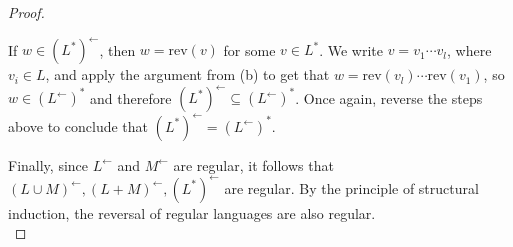 \documentclass[11pt]{article}
\begin{document}
\begin{proof}
\begin{enumerate}[label=(\alph*)]
            If \(w \in (L^*)^\leftarrow\), then \(w = \mathrm{rev} (v)\) for some \(v \in L^*\). We write \(v = v_1 \cdots v_l\), where \(v_i \in L\), and apply the argument from (b) to get that \(w = \mathrm{rev} (v_l) \cdots \mathrm{rev} (v_1)\), so \(w \in (L^\leftarrow)^*\) and therefore \((L^*)^\leftarrow \subseteq (L^\leftarrow)^*\). Once again, reverse the steps above to conclude that \((L^*)^\leftarrow = (L^\leftarrow)^*\).
        \end{enumerate}
        Finally, since \(L^\leftarrow\) and \(M^\leftarrow\) are regular, it follows that \((L \cup M)^\leftarrow, (L + M)^\leftarrow, (L^*)^\leftarrow\) are regular. By the principle of structural induction, the reversal of regular languages are also regular. \\
    \end{proof}
\end{document}
